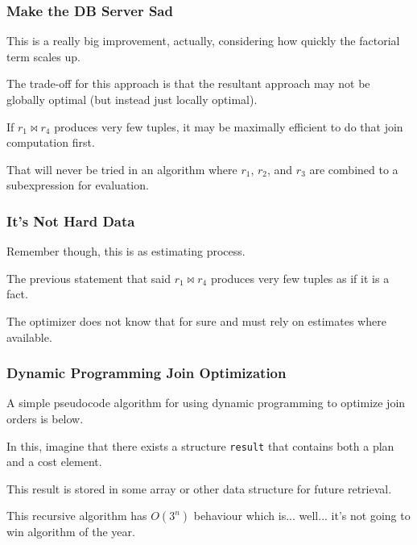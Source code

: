 \begin{frame}
\frametitle{Make the DB Server Sad}

This is a really big improvement, actually, considering how quickly the factorial term scales up. 

The trade-off for this approach is that the resultant approach may not be globally optimal (but instead just locally optimal). 

If $r_{1} \bowtie r_{4}$ produces very few tuples, it may be maximally efficient to do that join computation first.

That will never be tried in an algorithm where $r_{1}$, $r_{2}$, and $r_{3}$ are combined to a subexpression for evaluation. 

\end{frame}

\begin{frame}
\frametitle{It's Not Hard Data}

Remember though, this is as estimating process. 

The previous statement that said $r_{1} \bowtie r_{4}$ produces very few tuples as if it is a fact. 

The optimizer does not know that for sure and must rely on estimates where available. 


\end{frame}

\begin{frame}
\frametitle{Dynamic Programming Join Optimization}

A simple pseudocode algorithm for using dynamic programming to optimize join orders is below. 

In this, imagine that there exists a structure \texttt{result} that contains both a plan and a cost element. 

This result is stored in some array or other data structure for future retrieval. 

This recursive algorithm has $O(3^{n})$ behaviour which is... well... it's not going to win algorithm of the year.


\end{frame}


